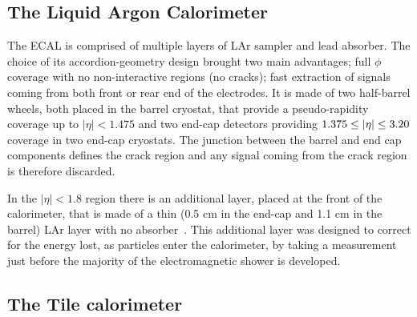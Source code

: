			\subsection*{The Liquid Argon Calorimeter}

 				The \ac{ECAL} is comprised of multiple layers of \ac{LAr} sampler and lead absorber. The choice of its accordion-geometry design brought two main advantages; full $\phi$ coverage with no non-interactive regions (no cracks); fast extraction of signals coming from both front or rear end of the electrodes. It is made of two half-barrel wheels, both placed in the barrel cryostat, that provide a pseudo-rapidity coverage up to $\left | \eta\right | < 1.475$ and two end-cap detectors providing $1.375 \leq |\eta| \leq 3.20$ coverage in two end-cap cryostats. The junction between the barrel and end cap components defines the crack region and any signal coming from the crack region is therefore discarded. 

 				In the $\left | \eta\right | < 1.8$ region there is an additional layer, placed at the front of the calorimeter, that is made of a thin (0.5 cm in the end-cap and 1.1 cm in the barrel) \ac{LAr} layer with no absorber~\cite{ATLASLAR}. This additional layer was designed to correct for the energy lost, as particles enter the calorimeter, by taking a measurement just before the majority of the electromagnetic shower is developed. 



			\subsection*{The Tile calorimeter}

